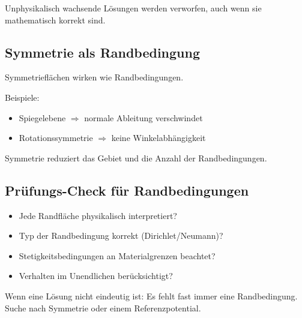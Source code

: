 \documentclass[a4paper]{article}
\begin{document}
\begin{schema}
Unphysikalisch wachsende Lösungen werden verworfen,
auch wenn sie mathematisch korrekt sind.
\end{schema}

\subsection{Symmetrie als Randbedingung}

Symmetrieflächen wirken wie Randbedingungen.

Beispiele:
\begin{itemize}
  \item Spiegelebene $\Rightarrow$ normale Ableitung verschwindet
  \item Rotationssymmetrie $\Rightarrow$ keine Winkelabhängigkeit
\end{itemize}

\begin{merke}
Symmetrie reduziert das Gebiet und die Anzahl der Randbedingungen.
\end{merke}

\subsection{Prüfungs-Check für Randbedingungen}

\begin{checkitem}
\begin{itemize}
  \item Jede Randfläche physikalisch interpretiert?
  \item Typ der Randbedingung korrekt (Dirichlet/Neumann)?
  \item Stetigkeitsbedingungen an Materialgrenzen beachtet?
  \item Verhalten im Unendlichen berücksichtigt?
\end{itemize}
\end{checkitem}

\begin{taktik}
Wenn eine Lösung nicht eindeutig ist:
Es fehlt fast immer eine Randbedingung.
Suche nach Symmetrie oder einem Referenzpotential.
\end{taktik}

\end{document}
